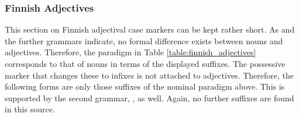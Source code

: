 \documentclass[11pt,a4paper,twoside,openright]{scrbook}
\begin{document}
\subsubsection{Finnish Adjectives}

This section on Finnish adjectival case markers can be kept rather short. As \citet{white2008finn} and the further grammars indicate, no formal difference exists between nouns and adjectives. Therefore, the paradigm in Table \ref{table:finnish_adjectives} corresponds to that of nouns in terms of the displayed suffixes. The possessive marker that changes these to infixes is not attached to adjectives. Therefore, the following forms are only those suffixes of the nominal paradigm above. This is supported by the second grammar, \citet{karlsson2018finn}, as well. Again, no further suffixes are found in this source.
\end{document}
